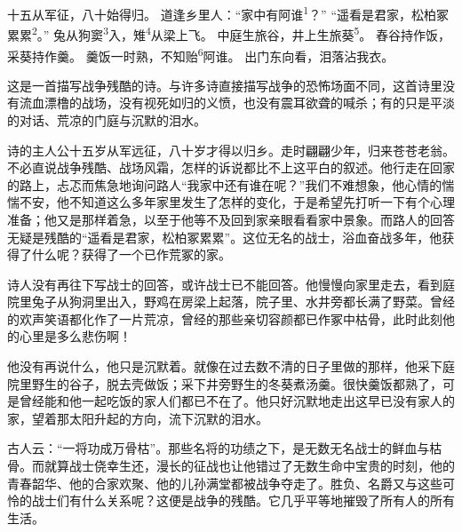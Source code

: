 
\begin{poem}
十五从军征，八十始得归。
道逢乡里人：“家中有阿谁\textsuperscript{1}？”
“遥看是君家，松柏冢累累\textsuperscript{2}。”
兔从狗窦\textsuperscript{3}入，雉\textsuperscript{4}从梁上飞。
中庭生旅谷，井上生旅葵\textsuperscript{5}。
舂谷持作饭，采葵持作羹。
羹饭一时熟，不知贻\textsuperscript{6}阿谁。
出门东向看，泪落沾我衣。
\end{poem}

\begin{annotations}
\end{annotations}

\begin{appreciation}
这是一首描写战争残酷的诗。与许多诗直接描写战争的恐怖场面不同，这首诗里没有流血漂橹的战场，没有视死如归的义愤，也没有震耳欲聋的喊杀；有的只是平淡的对话、荒凉的门庭与沉默的泪水。

诗的主人公十五岁从军远征，八十岁才得以归乡。走时翩翩少年，归来苍苍老翁。不必直说战争残酷、战场风霜，怎样的诉说都比不上这平白的叙述。他行走在回家的路上，忐忑而焦急地询问路人“我家中还有谁在呢？”我们不难想象，他心情的惴惴不安，他不知道这么多年家里发生了怎样的变化，于是希望先打听一下有个心理准备；他又是那样着急，以至于他等不及回到家亲眼看看家中景象。而路人的回答无疑是残酷的“遥看是君家，松柏冢累累”。这位无名的战士，浴血奋战多年，他获得了什么呢？获得了一个已作荒冢的家。

诗人没有再往下写战士的回答，或许战士已不能回答。他慢慢向家里走去，看到庭院里兔子从狗洞里出入，野鸡在房梁上起落，院子里、水井旁都长满了野菜。曾经的欢声笑语都化作了一片荒凉，曾经的那些亲切容颜都已作冢中枯骨，此时此刻他的心里是多么悲伤啊！

他没有再说什么，他只是沉默着。就像在过去数不清的日子里做的那样，他采下庭院里野生的谷子，脱去壳做饭；采下井旁野生的冬葵煮汤羹。很快羹饭都熟了，可是曾经能和他一起吃饭的家人们都已不在了。他只好沉默地走出这早已没有家人的家，望着那太阳升起的方向，流下沉默的泪水。

古人云：“一将功成万骨枯”。那些名将的功绩之下，是无数无名战士的鲜血与枯骨。而就算战士侥幸生还，漫长的征战也让他错过了无数生命中宝贵的时刻，他的青春韶华、他的合家欢聚、他的儿孙满堂都被战争夺走了。胜负、名爵又与这些可怜的战士们有什么关系呢？这便是战争的残酷。它几乎平等地摧毁了所有人的所有生活。
\end{appreciation}
